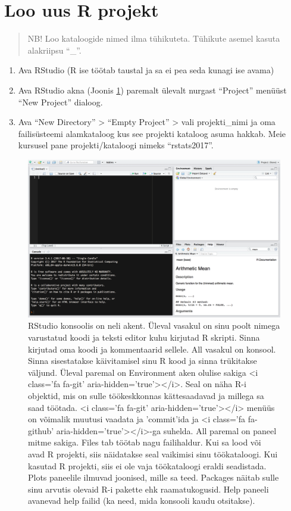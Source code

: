 \documentclass[]{book}
\providecommand{\tightlist}{%
  \setlength{\itemsep}{0pt}\setlength{\parskip}{0pt}}
\begin{document}
\section{Loo uus R projekt}\label{loo-uus-r-projekt}

\begin{quote}
NB! Loo kataloogide nimed ilma tühikuteta. Tühikute asemel kasuta
alakriipsu ``\_''.
\end{quote}

\begin{enumerate}
\def\labelenumi{\arabic{enumi}.}
\setcounter{enumi}{3}
\tightlist
\item
  Ava RStudio (R ise töötab taustal ja sa ei pea seda kunagi ise avama)
\item
  Ava RStudio akna (Joonis \ref{fig:rstudiowindow}) paremalt ülevalt
  nurgast ``Project'' menüüst ``New Project'' dialoog.
\item
  Ava ``New Directory'' \textgreater{} ``Empty Project'' \textgreater{}
  vali projekti\_nimi ja oma failisüsteemi alamkataloog kus see projekti
  kataloog asuma hakkab. Meie kursusel pane projekti/kataloogi nimeks
  ``rstats2017''.
\end{enumerate}

\begin{figure}
\includegraphics[width=35.56in]{assets/img/rstudio_screen_untitled} \caption{RStudio konsoolis on neli akent. Üleval vasakul on sinu poolt nimega varustatud koodi ja teksti editor kuhu kirjutad R skripti. Sinna kirjutad oma koodi ja kommentaarid sellele. All vasakul on konsool. Sinna sisestatakse käivitamisel sinu R kood ja sinna trükitakse väljund. Üleval paremal on Environment aken olulise sakiga <i class='fa fa-git' aria-hidden='true'></i>. Seal on näha R-i objektid, mis on sulle töökeskkonnas kättesaadavad ja millega sa saad töötada. <i class='fa fa-git' aria-hidden='true'></i> menüüs on võimalik muutusi vaadata ja 'commit'ida ja <i class='fa fa-github' aria-hidden='true'></i>-ga suhelda. All paremal on paneel mitme sakiga. Files tab töötab nagu failihaldur. Kui sa lood või avad R projekti, siis näidatakse seal vaikimisi sinu töökataloogi. Kui kasutad R projekti, siis ei ole vaja töökataloogi eraldi seadistada. Plots paneelile ilmuvad joonised, mille sa teed. Packages näitab sulle sinu arvutis olevaid R-i pakette ehk raamatukogusid. Help paneeli avanevad help failid (ka need, mida konsooli kaudu otsitakse).}\label{fig:rstudiowindow}
\end{figure}
\end{document}
